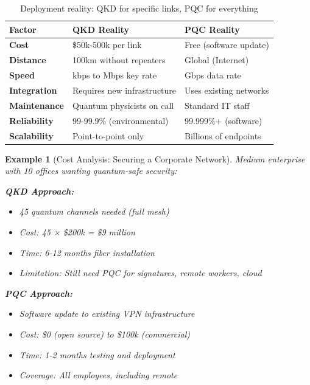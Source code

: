 \documentclass[11pt,a4paper]{article}
\newtheorem{example}{Example}
\begin{document}
\begin{table}[h]
\centering
\begin{tabular}{|l|p{5cm}|p{5cm}|}
\hline
\textbf{Factor} & \textbf{QKD Reality} & \textbf{PQC Reality} \\
\hline
\textbf{Cost} & \$50k-500k per link & Free (software update) \\
\textbf{Distance} & 100km without repeaters & Global (Internet) \\
\textbf{Speed} & kbps to Mbps key rate & Gbps data rate \\
\textbf{Integration} & Requires new infrastructure & Uses existing networks \\
\textbf{Maintenance} & Quantum physicists on call & Standard IT staff \\
\textbf{Reliability} & 99-99.9\% (environmental) & 99.999\%+ (software) \\
\textbf{Scalability} & Point-to-point only & Billions of endpoints \\
\hline
\end{tabular}
\caption{Deployment reality: QKD for specific links, PQC for everything}
\end{table}

\begin{example}[Cost Analysis: Securing a Corporate Network]
Medium enterprise with 10 offices wanting quantum-safe security:

\textbf{QKD Approach:}
\begin{itemize}
    \item 45 quantum channels needed (full mesh)
    \item Cost: 45 × \$200k = \$9 million
    \item Time: 6-12 months fiber installation
    \item Limitation: Still need PQC for signatures, remote workers, cloud
\end{itemize}

\textbf{PQC Approach:}
\begin{itemize}
    \item Software update to existing VPN infrastructure
    \item Cost: \$0 (open source) to \$100k (commercial)
    \item Time: 1-2 months testing and deployment
    \item Coverage: All employees, including remote
\end{itemize}
\end{example}
\end{document}
